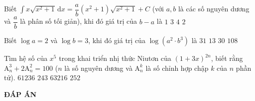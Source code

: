 \begin{ex}%
	Biết $\displaystyle\int {x \sqrt{x^2+1}}\mathrm{\, d}x=\dfrac{a}{b}(x^2+1)\sqrt{x^2+1}+C$ (với $a,b$ là các số nguyên dương và $\dfrac{a}{b}$ là phân số tối giản), khi đó giá trị của $b-a$ là
	\choice
	{$1$}
	{$3$}
	{$4$}
	{\True $2$}
\end{ex}

\begin{ex}%
	Biết $\log a = 2$ và $\log b=3$, khi đó giá trị của $\log \left(a^2 \cdot b^3\right)$ là
	\choice
	{$31$}
	{\True $13$}
	{$30$}
	{$108$}
\end{ex}

\begin{ex}%
	Tìm hệ số của $x^5$ trong khai triển nhị thức Niutơn của $(1+3x)^{2n}$, biết rằng $\mathrm{A}_n^3 +2\mathrm{A}_n^2=100$ ($n$ là số nguyên dương và $\mathrm{A}_n^k$ là số chỉnh hợp chập $k$ của $n$ phần tử). 
	\choice
	{\True $61236$}
	{$243$}
	{$63216$}
	{$252$}
\end{ex}

\newpage
\begin{center}
	\textbf{ĐÁP ÁN}
\end{center}
\begin{multicols}{10}
	 
\end{multicols}

